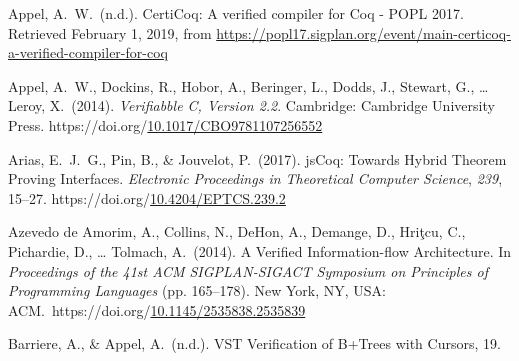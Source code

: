 \documentclass[12pt,twoside]{article}
\begin{document}
{\begin{thebibliography}{222}
\mdbibitemlabel{[Appel, n.d.]}Appel, A.~W.~(n.d.). CertiCoq: A verified compiler for Coq - POPL 2017. Retrieved February 1, 2019, from \href{https://popl17.sigplan.org/event/main-certicoq-a-verified-compiler-for-coq}{{\ttfamily https://\hspace{0pt}popl17.\hspace{0pt}sigplan.\hspace{0pt}org/\hspace{0pt}event/\hspace{0pt}main-\hspace{0pt}certicoq-\hspace{0pt}a-\hspace{0pt}verified-\hspace{0pt}compiler-\hspace{0pt}for-\hspace{0pt}coq}}\label{appel_certicoq:_nodate}%

\mdbibitemlabel{[Appel et al., 2014]}Appel, A.~W., Dockins, R., Hobor, A., Beringer, L., Dodds, J., Stewart, G., … Leroy, X.~(2014). \emph{Verifiabble C, Version 2.2}. Cambridge: Cambridge University Press. https://doi.org/\href{https://dx.doi.org/10.1017/CBO9781107256552}{10.1017/CBO9781107256552}\label{appel_verifiabble_2014}%

Arias, E.~J.~G., Pin, B., \& Jouvelot, P.~(2017). jsCoq: Towards Hybrid Theorem Proving Interfaces. \emph{Electronic Proceedings in Theoretical Computer Science}, \emph{239}, 15–27. https://doi.org/\href{https://dx.doi.org/10.4204/EPTCS.239.2}{10.4204/EPTCS.239.2}\label{arias_jscoq:_2017}%

Azevedo de Amorim, A., Collins, N., DeHon, A., Demange, D., Hriţcu, C., Pichardie, D., … Tolmach, A.~(2014). A Verified Information-flow Architecture. In \emph{Proceedings of the 41st ACM SIGPLAN-SIGACT Symposium on Principles of Programming Languages} (pp. 165–178). New York, NY, USA: ACM.~https://doi.org/\href{https://dx.doi.org/10.1145/2535838.2535839}{10.1145/2535838.2535839}\label{azevedo_de_amorim_verified_2014}%

Barriere, A., \& Appel, A.~(n.d.). VST Veriﬁcation of B+Trees with Cursors, 19.\label{barriere_vst_nodate}%


\end{thebibliography}}
\end{document}
